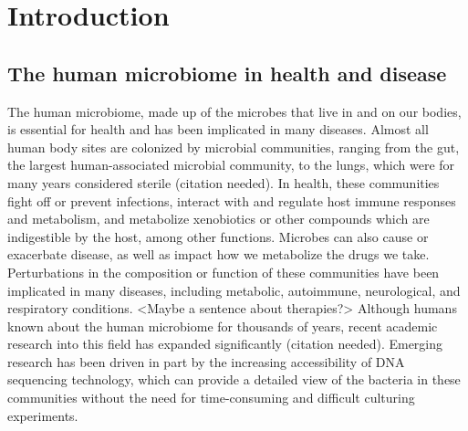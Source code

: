 
\chapter{Introduction}

\section{The human microbiome in health and disease}

The human microbiome, made up of the microbes that live in and on our bodies, is essential for health and has been implicated in many diseases.
Almost all human body sites are colonized by microbial communities, ranging from the gut, the largest human-associated microbial community, to the lungs, which were for many years considered sterile (citation needed).
In health, these communities fight off or prevent infections, interact with and regulate host immune responses and metabolism, and metabolize xenobiotics or other compounds which are indigestible by the host, among other functions.
Microbes can also cause or exacerbate disease, as well as impact how we metabolize the drugs we take.
Perturbations in the composition or function of these communities have been implicated in many diseases, including metabolic, autoimmune, neurological, and respiratory conditions.
<Maybe a sentence about therapies?>
Although humans known about the human microbiome for thousands of years, recent academic research into this field has expanded significantly (citation needed).
Emerging research has been driven in part by the increasing accessibility of DNA sequencing technology, which can provide a detailed view of the bacteria in these communities without the need for time-consuming and difficult culturing experiments.

